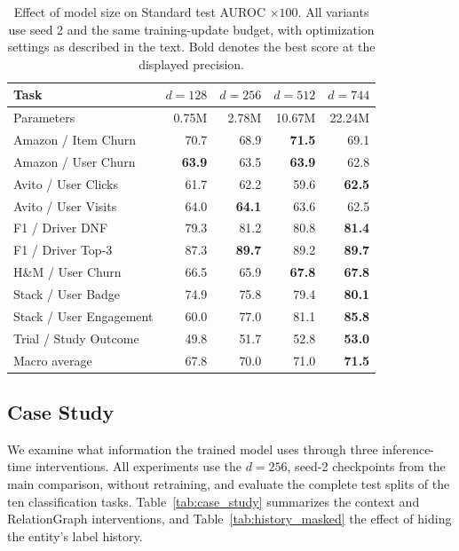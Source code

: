 \begin{table}[t]
\centering
\caption{Effect of model size on Standard test AUROC $\times100$. All
\model{} variants use seed 2 and the same training-update budget, with
optimization settings as described in the text.
Bold denotes the best score at the displayed precision.}
\label{tab:model_size}
\small
\setlength{\tabcolsep}{5pt}
\begin{tabular}{lrrrr}
\toprule
Task & $d=128$ & $d=256$ & $d=512$ & $d=744$ \\
\midrule
Parameters & 0.75M & 2.78M & 10.67M & 22.24M \\
\midrule
Amazon / Item Churn & 70.7 & 68.9 & \textbf{71.5} & 69.1 \\
Amazon / User Churn & \textbf{63.9} & 63.5 & \textbf{63.9} & 62.8 \\
Avito / User Clicks & 61.7 & 62.2 & 59.6 & \textbf{62.5} \\
Avito / User Visits & 64.0 & \textbf{64.1} & 63.6 & 62.5 \\
F1 / Driver DNF & 79.3 & 81.2 & 80.8 & \textbf{81.4} \\
F1 / Driver Top-3 & 87.3 & \textbf{89.7} & 89.2 & \textbf{89.7} \\
H\&M / User Churn & 66.5 & 65.9 & \textbf{67.8} & \textbf{67.8} \\
Stack / User Badge & 74.9 & 75.8 & 79.4 & \textbf{80.1} \\
Stack / User Engagement & 60.0 & 77.0 & 81.1 & \textbf{85.8} \\
Trial / Study Outcome & 49.8 & 51.7 & 52.8 & \textbf{53.0} \\
\midrule
Macro average & 67.8 & 70.0 & 71.0 & \textbf{71.5} \\
\bottomrule
\end{tabular}
\end{table}

\subsection{Case Study}
\label{sec:case_study}

We examine what information the trained model uses through three
inference-time interventions. All \model{} experiments use the $d=256$,
seed-2 checkpoints from the main comparison, without retraining, and evaluate
the complete test splits of the ten classification tasks.
Table~\ref{tab:case_study} summarizes the context and RelationGraph
interventions, and Table~\ref{tab:history_masked} the effect of hiding the
entity's label history.

